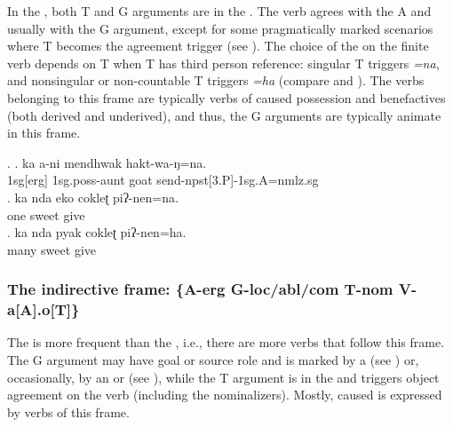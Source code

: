 
\noindent
In the , both T and G arguments are in the  . The verb agrees with the A and usually with the G argument, except for some pragmatically marked scenarios where T becomes the agreement trigger (see ). The choice of the  on the finite verb depends on T when T has third person reference: singular T triggers \emph{=na}, and nonsingular or non-countable T triggers \emph{=ha} (compare \Next[b] and \Next[c]). The verbs belonging to this frame are typically verbs of caused possession and benefactives (both derived and underived), and thus, the G arguments are typically animate in this frame.
 
\ex. \ag. ka  a-ni mendhwak hakt-wa-ŋ=na.\\
{\sc 1sg[erg]} {\sc 1sg.poss}-aunt goat send{\sc -npst[3.P]-1sg.A=nmlz.sg}\\
\bg. ka nda eko cokleʈ piʔ-nen=na.\\
		  one sweet give\\
	\bg. ka nda pyak cokleʈ piʔ-nen=ha.\\
	  many sweet give\\

\subsubsection[The indirective frame]{The indirective frame: \{A-{\sc erg}  G-{\sc loc/abl/com} T-{\sc nom} V-a[A].o[T]\}}


\noindent
The  is more frequent than the , i.e., there are more verbs that follow this frame. The G argument may have goal or source role and is marked by a  (see \Next) or, occasionally, by an  or   (see \NNext), while the T argument is in the  and triggers object agreement on the verb (including the nominalizers). Mostly, caused  is  expressed by verbs of this frame. 

